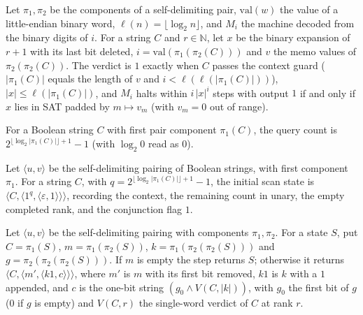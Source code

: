 \begin{definition}
\label{Complexity.ladner_wordVerdict}
\leanok
{}
Let $\pi_1,\pi_2$ be the components of a self-delimiting pair, $\mathrm{val}(w)$ the value of
a little-endian binary word, $\ell(n)=\lfloor\log_2 n\rfloor$, and $M_i$ the machine decoded
from the binary digits of $i$. For a string $C$ and $r\in\mathbb N$, let $x$ be the binary
expansion of $r+1$ with its last bit deleted, $i=\mathrm{val}(\pi_1(\pi_2(C)))$ and $v$ the
memo values of $\pi_2(\pi_2(C))$. The verdict is $1$ exactly when $C$ passes the context
guard ($|\pi_1(C)|$ equals the length of $v$ and $i<\ell(\ell(|\pi_1(C)|))$),
$|x|\le\ell(|\pi_1(C)|)$, and $M_i$ halts within $i\,|x|^i$ steps with output $1$ if and only
if $x$ lies in SAT padded by $m\mapsto v_m$ (with $v_m=0$ out of range).
\end{definition}

\begin{definition}
\label{Complexity.ladner_queryCount}
\leanok
{}
For a Boolean string $C$ with first pair component $\pi_1(C)$, the query count is
$2^{\lfloor\log_2|\pi_1(C)|\rfloor+1}-1$ (with $\log_2 0$ read as $0$).
\end{definition}

\begin{definition}
\label{Complexity.ladner_testInit}
\leanok
{}
Let $\langle u,v\rangle$ be the self-delimiting pairing of Boolean strings, with first
component $\pi_1$. For a string $C$, with $q=2^{\lfloor\log_2|\pi_1(C)|\rfloor+1}-1$, the
initial scan state is $\langle C,\langle 1^{q},\langle\varepsilon,1\rangle\rangle\rangle$,
recording the context, the remaining count in unary, the empty completed rank, and the
conjunction flag $1$.
\end{definition}

\begin{definition}
\label{Complexity.ladner_testStep}
\leanok
{}
Let $\langle u,v\rangle$ be the self-delimiting pairing with components $\pi_1,\pi_2$. For a
state $S$, put $C=\pi_1(S)$, $m=\pi_1(\pi_2(S))$, $k=\pi_1(\pi_2(\pi_2(S)))$ and
$g=\pi_2(\pi_2(\pi_2(S)))$. If $m$ is empty the step returns $S$; otherwise it returns
$\langle C,\langle m',\langle k1,c\rangle\rangle\rangle$, where $m'$ is $m$ with its first
bit removed, $k1$ is $k$ with a $1$ appended, and $c$ is the one-bit string
$(g_0\wedge V(C,|k|))$, with $g_0$ the first bit of $g$ ($0$ if $g$ is empty) and $V(C,r)$
the single-word verdict of $C$ at rank $r$.
\end{definition}


